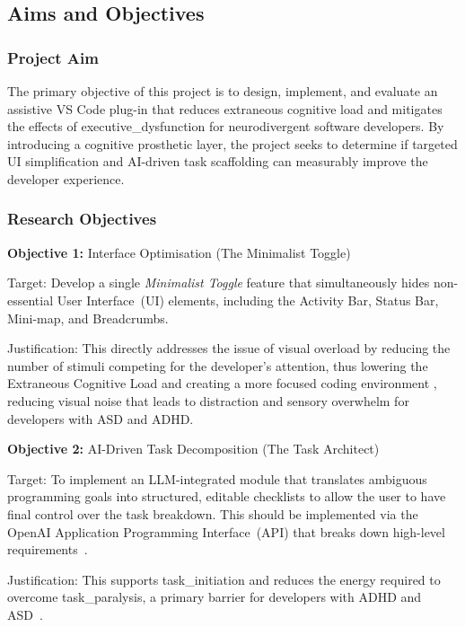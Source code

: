 \subsection{Aims and Objectives}

\subsubsection{Project Aim}

The primary objective of this project is to design, implement, and evaluate an assistive VS Code plug-in that reduces extraneous cognitive load and mitigates the effects of
 \gls{executive_dysfunction} for \gls{neurodivergent} software developers. By introducing a cognitive prosthetic layer, the project seeks
  to determine if targeted \gls{UI} simplification and \gls{AI}-driven task \gls{scaffolding} can measurably improve the developer experience.

\subsubsection{Research Objectives}

\textbf{Objective 1:} Interface Optimisation (The Minimalist Toggle)

Target: Develop a single \textit{Minimalist Toggle} feature that simultaneously hides non-essential User Interface~(\gls{UI}) elements, including the Activity Bar, Status Bar, Mini-map, and Breadcrumbs.


Justification: This directly addresses the issue of visual overload by reducing the number of stimuli competing for the developer's attention, thus lowering the Extraneous
 Cognitive Load and creating a more focused coding environment \cite{sweller1988cognitive}, reducing visual noise that leads to distraction and sensory overwhelm for developers with \gls{ASD} and \gls{ADHD}.

\textbf{Objective 2: }\gls{AI}-Driven Task Decomposition (The Task Architect)

Target: To implement an \gls{LLM}-integrated module that translates ambiguous programming goals into structured, editable checklists to allow the user to have final control over the task breakdown. This should be
implemented via the Open\gls{AI} Application Programming Interface~(\gls{API}) that breaks down high-level requirements~\cite{ringel2019ai}.


Justification: This supports \gls{task_initiation} and reduces the energy required to overcome \gls{task_paralysis}, a primary barrier for developers with \gls{ADHD} and \gls{ASD}~\cite{gama2025socio}.

